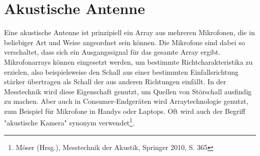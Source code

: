 \section{Akustische Antenne}
	Eine akustische Antenne ist prinzipiell ein Array aus mehreren Mikrofonen, die in beliebiger Art und Weise angeordnet sein können.
	Die Mikrofone sind dabei so verschaltet, dass sich ein Ausgangssignal für das gesamte Array ergibt.
	Mikrofonarrays können eingesetzt werden, um bestimmte Richtcharakteristika zu erzielen, also beispielsweise den Schall aus einer bestimmten Einfallsrichtung stärker übertragen als Schall der aus anderen Richtungen einfällt.
	In der Messtechnik wird diese Eigenschaft genutzt, um Quellen von Störschall ausfindig zu machen. %
	Aber auch in Consumer-Endgeräten wird Arraytechnologie genutzt, zum Beispiel für Mikrofone in Handys oder Laptops.
	Oft wird auch der Begriff "akustische Kamera" synonym verwendet\footnote{Möser (Hrsg.), Messtechnik der Akustik, Springer 2010, S. 365}.